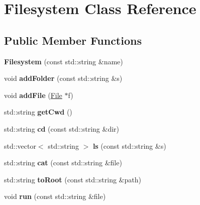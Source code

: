 \hypertarget{class_filesystem}{}\section{Filesystem Class Reference}
\label{class_filesystem}
\subsection*{Public Member Functions}
\begin{DoxyCompactItemize}
\item 
\hypertarget{class_filesystem_add49abb4ab07ed5e30cecf13a4788763}{}\label{class_filesystem_add49abb4ab07ed5e30cecf13a4788763} 
{\bfseries Filesystem} (const std\+::string \&name)
\item 
\hypertarget{class_filesystem_aca3f43e7007db68ee3d8c7aa54817d50}{}\label{class_filesystem_aca3f43e7007db68ee3d8c7aa54817d50} 
void {\bfseries add\+Folder} (const std\+::string \&s)
\item 
\hypertarget{class_filesystem_a4077af11b72a6b4a799e8df3536cc915}{}\label{class_filesystem_a4077af11b72a6b4a799e8df3536cc915} 
void {\bfseries add\+File} (\hyperlink{class_file}{File} $\ast$f)
\item 
\hypertarget{class_filesystem_a99756d50bf21030eccdc02f20bfac839}{}\label{class_filesystem_a99756d50bf21030eccdc02f20bfac839} 
std\+::string {\bfseries get\+Cwd} ()
\item 
\hypertarget{class_filesystem_acde9704dcfc564002841cd3c7a97e439}{}\label{class_filesystem_acde9704dcfc564002841cd3c7a97e439} 
std\+::string {\bfseries cd} (const std\+::string \&dir)
\item 
\hypertarget{class_filesystem_a57bb81a4d8a2f2d1fec16c60399d6820}{}\label{class_filesystem_a57bb81a4d8a2f2d1fec16c60399d6820} 
std\+::vector$<$ std\+::string $>$ {\bfseries ls} (const std\+::string \&s)
\item 
\hypertarget{class_filesystem_ad07ad4eca174dc1ce88df4050dadd4cf}{}\label{class_filesystem_ad07ad4eca174dc1ce88df4050dadd4cf} 
std\+::string {\bfseries cat} (const std\+::string \&file)
\item 
\hypertarget{class_filesystem_adb6294ff510eab4f4e704dd0d1dcd247}{}\label{class_filesystem_adb6294ff510eab4f4e704dd0d1dcd247} 
std\+::string {\bfseries to\+Root} (const std\+::string \&path)
\item 
\hypertarget{class_filesystem_ae6ccb1af9245376cc2eedfe0e6fc38d4}{}\label{class_filesystem_ae6ccb1af9245376cc2eedfe0e6fc38d4} 
void {\bfseries run} (const std\+::string \&file)
\end{DoxyCompactItemize}
